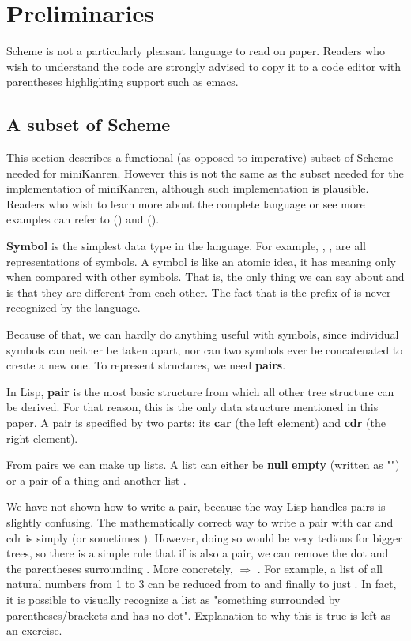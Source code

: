 \section{Preliminaries}
\label{prelim}
Scheme is not a particularly pleasant language to read on paper.
Readers who wish to understand the code are strongly advised to copy it to a code editor with parentheses highlighting support such as emacs.

\subsection{A subset of Scheme}
This section describes a functional (as opposed to imperative) subset of Scheme needed for miniKanren. However this is not the same as the subset needed for the implementation of miniKanren, although such implementation is plausible.
Readers who wish to learn more about the complete language or see more examples can refer to (\textcite{tspl4}) and (\textcite{sicp}).

\textbf{Symbol} is the simplest data type in the language. For example, , ,  are all representations of symbols.
A symbol is like an atomic idea, it has meaning only when compared with other symbols. That is, the only thing we can say about  and  is that they are different from each other. The fact that  is the prefix of  is never recognized by the language.

Because of that, we can hardly do anything useful with symbols, since individual symbols can neither be taken apart, nor can two symbols ever be concatenated to create a new one. To represent structures, we need \textbf{pairs}.

In Lisp, \textbf{pair} is the most basic structure from which all other tree structure can be derived.
For that reason, this is the only data structure mentioned in this paper.
A pair is specified by two parts: its \textbf{car} (the left element) and \textbf{cdr} (the right element).

From pairs we can make up lists. A list can either be \textbf{null} \textbf{empty} (written as "\code{()}") or a pair of a thing  and another list .

We have not shown how to write a pair, because the way Lisp handles pairs is slightly confusing. The mathematically correct way to write a pair with car  and cdr  is simply  (or sometimes \code{[a . d]}).
However, doing so would be very tedious for bigger trees, so there is a simple rule that if  is also a pair, we can remove the dot and the parentheses surrounding . More concretely,  $\Rightarrow$ .
For example, a list of all natural numbers from 1 to 3 can be reduced from  to  and finally to just . In fact, it is possible to visually recognize a list as "something surrounded by parentheses/brackets and has no dot". Explanation to why this is true is left as an exercise.

